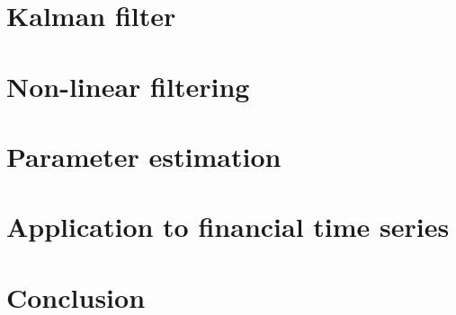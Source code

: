 \documentclass[12pt, twoside, a4paper, openright]{report}
\theoremstyle{plain} %
\theoremstyle{definition} %
\theoremstyle{remark} %
\begin{document}
\newpage
\chapter{Kalman filter}\label{chap:kalman}


\newpage
\chapter{Non-linear filtering}\label{chap:nonlinear}


\newpage
\chapter{Parameter estimation}\label{chap:parameter}


\newpage
\chapter{Application to financial time series}\label{chap:portfolio}


\newpage
\chapter{Conclusion}\label{chap:conclusion}

\cleardoublepage
% 

\newpage
\nocite{*}
\printbibliography
\end{document}
